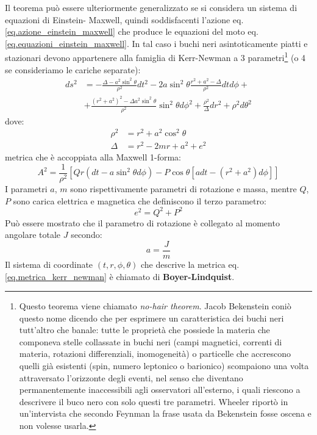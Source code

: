 Il teorema può essere ulteriormente generalizzato se si considera un sistema di equazioni di Einstein- Maxwell, quindi soddisfacenti l'azione eq. \ref{eq.azione_einstein_maxwell} che produce le equazioni del moto eq. \ref{eq.equazioni_einstein_maxwell}. 
In tal caso i buchi neri asintoticamente piatti e stazionari devono appartenere alla famiglia di Kerr-Newman a 3 parametri\footnote{Questo teorema viene chiamato \textit{no-hair theorem}. Jacob Bekenstein coniò questo nome dicendo che  per esprimere un caratteristica dei buchi neri tutt'altro che banale:  tutte le proprietà che possiede la materia che componeva stelle collassate in buchi neri (campi magnetici, correnti di materia, rotazioni differenziali, inomogeneità) o particelle che accrescono quelli già esistenti (spin, numero leptonico o barionico) scompaiono una volta attraversato l'orizzonte degli eventi, nel senso che diventano permanentemente inaccessibili agli osservatori all'esterno, i quali riescono a descrivere il buco nero con solo questi tre parametri. Wheeler riportò in un'intervista che secondo Feynman la frase usata da Bekenstein fosse oscena e non volesse usarla.} (o 4 se consideriamo le cariche separate):
\begin{align}
    ds^2 &= - \frac{\Delta - a^2\sin^2\theta}{\rho^2}dt^2 - 2a\sin^2\theta\frac{r^2+a^2- \Delta}{\rho^2}dtd\phi + \nonumber \\
    & + \frac{(r^2+a^2)^2 - \Delta a^2\sin^2\theta}{\rho^2}\sin^2\theta d\phi^2 + \frac{\rho^2}{\Delta}dr^2 + \rho^2 d\theta^2
    \label{eq.metrica_kerr_newman}
\end{align}
dove:
\begin{align*}
    \rho^2 &= r^2 +a^2\cos^2\theta \\
    \Delta &= r^2 -2mr + a^2 + e^2
\end{align*}
metrica  che è accoppiata alla Maxwell 1-forma:
\begin{equation}
    A^2 = \frac{1}{\rho^2}\left[Qr(dt - a\sin^2\theta d\phi) - P\cos\theta[ adt - (r^2+a^2)d\phi] \right]
    \label{eq.maxwell_1forma}
\end{equation}
I parametri $a$, $m$ sono rispettivamente parametri di rotazione e massa, mentre $Q$, $P$ sono carica elettrica e magnetica che definiscono il terzo parametro:
\begin{equation*}
    e^2 = Q^2 + P^2
\end{equation*}
Può essere mostrato che il parametro di rotazione è collegato al momento angolare totale $J$ secondo:
\begin{equation*}
    a = \frac{J}{m}
\end{equation*}
Il sistema di coordinate $(t,r,\phi,\theta)$ che descrive la metrica eq. \ref{eq.metrica_kerr_newman} è chiamato di \textbf{Boyer-Lindquist}.

